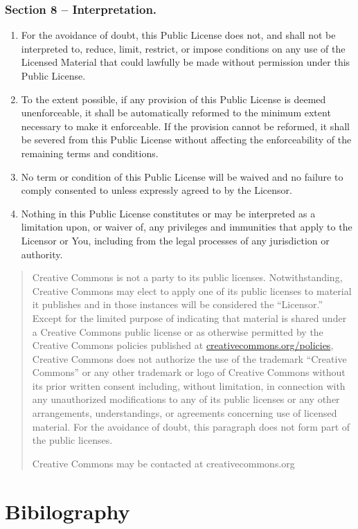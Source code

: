 \documentclass[]{book}
\begin{document}
\hypertarget{section-8-interpretation.}{%
\subsection{Section 8 -- Interpretation.}\label{section-8-interpretation.}}

\begin{enumerate}
\def\labelenumi{\alph{enumi}.}
\item
  For the avoidance of doubt, this Public License does not, and shall not be interpreted to, reduce, limit, restrict, or impose conditions on any use of the Licensed Material that could lawfully be made without permission under this Public License.
\item
  To the extent possible, if any provision of this Public License is deemed unenforceable, it shall be automatically reformed to the minimum extent necessary to make it enforceable. If the provision cannot be reformed, it shall be severed from this Public License without affecting the enforceability of the remaining terms and conditions.
\item
  No term or condition of this Public License will be waived and no failure to comply consented to unless expressly agreed to by the Licensor.
\item
  Nothing in this Public License constitutes or may be interpreted as a limitation upon, or waiver of, any privileges and immunities that apply to the Licensor or You, including from the legal processes of any jurisdiction or authority.
\end{enumerate}

\begin{quote}
Creative Commons is not a party to its public licenses. Notwithstanding, Creative Commons may elect to apply one of its public licenses to material it publishes and in those instances will be considered the ``Licensor.'' Except for the limited purpose of indicating that material is shared under a Creative Commons public license or as otherwise permitted by the Creative Commons policies published at \href{http://creativecommons.org/policies}{creativecommons.org/policies}, Creative Commons does not authorize the use of the trademark ``Creative Commons'' or any other trademark or logo of Creative Commons without its prior written consent including, without limitation, in connection with any unauthorized modifications to any of its public licenses or any other arrangements, understandings, or agreements concerning use of licensed material. For the avoidance of doubt, this paragraph does not form part of the public licenses.

Creative Commons may be contacted at creativecommons.org
\end{quote}

\hypertarget{bibilography}{%
\chapter{Bibilography}\label{bibilography}}


\end{document}
